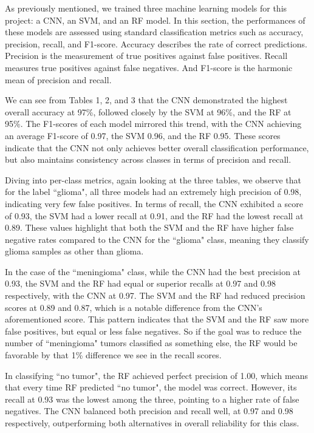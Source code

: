 \documentclass[conference]{IEEEtran}
\begin{document}
As previously mentioned, we trained three machine learning models for this project: a CNN, an SVM, and an RF model. In this section, the performances of these models are assessed using standard classification metrics such as accuracy, precision, recall, and F1-score. Accuracy describes the rate of correct predictions. Precision is the measurement of true positives against false positives. Recall measures true positives against false negatives. And F1-score is the harmonic mean of precision and recall.

\vspace{1.5em}

We can see from Tables 1, 2, and 3 that the CNN demonstrated the highest overall accuracy at 97\%, followed closely by the SVM at 96\%, and the RF at 95\%. The F1-scores of each model mirrored this trend, with the CNN achieving an average F1-score of 0.97, the SVM 0.96, and the RF 0.95. These scores indicate that the CNN not only achieves better overall classification performance, but also maintains consistency across classes in terms of precision and recall.

Diving into per-class metrics, again looking at the three tables, we observe that for the label ``glioma", all three models had an extremely high precision of 0.98, indicating very few false positives. In terms of recall, the CNN exhibited a score of 0.93, the SVM had a lower recall at 0.91, and the RF had the lowest recall at 0.89. These values highlight that both the SVM and the RF have higher false negative rates compared to the CNN for the ``glioma" class, meaning they classify glioma samples as other than glioma.

In the case of the ``meningioma" class, while the CNN had the best precision at 0.93, the SVM and the RF had equal or superior recalls at 0.97 and 0.98 respectively, with the CNN at 0.97. The SVM and the RF had reduced precision scores at 0.89 and 0.87, which is a notable difference from the CNN's aforementioned score. This pattern indicates that the SVM and the RF saw more false positives, but equal or less false negatives. So if the goal was to reduce the number of ``meningioma" tumors classified as something else, the RF would be favorable by that 1\% difference we see in the recall scores. 

In classifying ``no tumor", the RF achieved perfect precision of 1.00, which means that every time RF predicted ``no tumor", the model was correct. However, its recall at 0.93 was the lowest among the three, pointing to a higher rate of false negatives. The CNN balanced both precision and recall well, at 0.97 and 0.98 respectively, outperforming both alternatives in overall reliability for this class.
\end{document}
